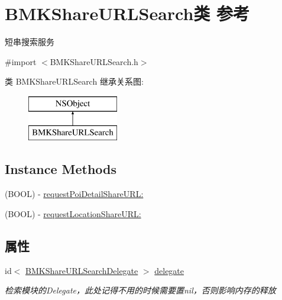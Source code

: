 \hypertarget{interface_b_m_k_share_u_r_l_search}{\section{B\+M\+K\+Share\+U\+R\+L\+Search类 参考}
\label{interface_b_m_k_share_u_r_l_search}
}


短串搜索服务  




{\ttfamily \#import $<$B\+M\+K\+Share\+U\+R\+L\+Search.\+h$>$}

类 B\+M\+K\+Share\+U\+R\+L\+Search 继承关系图\+:\begin{figure}[H]
\begin{center}
\leavevmode
\includegraphics[height=2.000000cm]{interface_b_m_k_share_u_r_l_search}
\end{center}
\end{figure}
\subsection*{Instance Methods}
\begin{DoxyCompactItemize}
\item 
(B\+O\+O\+L) -\/ \hyperlink{interface_b_m_k_share_u_r_l_search_a91351e2591a3918fc233ba8ca42c83be}{request\+Poi\+Detail\+Share\+U\+R\+L\+:}
\item 
(B\+O\+O\+L) -\/ \hyperlink{interface_b_m_k_share_u_r_l_search_a42ece3de1f45f2fd3be760f78e37b9b2}{request\+Location\+Share\+U\+R\+L\+:}
\end{DoxyCompactItemize}
\subsection*{属性}
\begin{DoxyCompactItemize}
\item 
\hypertarget{interface_b_m_k_share_u_r_l_search_af3d6d7b5ecf6c9b09b292c1684dad3db}{id$<$ \hyperlink{protocol_b_m_k_share_u_r_l_search_delegate-p}{B\+M\+K\+Share\+U\+R\+L\+Search\+Delegate} $>$ \hyperlink{interface_b_m_k_share_u_r_l_search_af3d6d7b5ecf6c9b09b292c1684dad3db}{delegate}}\label{interface_b_m_k_share_u_r_l_search_af3d6d7b5ecf6c9b09b292c1684dad3db}

\begin{DoxyCompactList}\small\item\em 检索模块的\+Delegate，此处记得不用的时候需要置nil，否则影响内存的释放 \end{DoxyCompactList}\end{DoxyCompactItemize}


